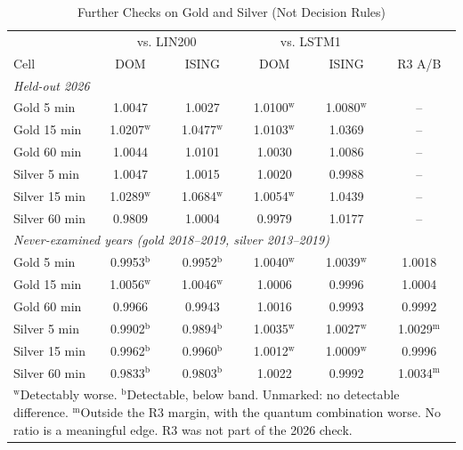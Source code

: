\documentclass{ieeeaccess}
\begin{document}
\begin{table}[t]
\caption{Further Checks on Gold and Silver (Not Decision Rules)}
\label{tab:heldcheck}
\centering
\setlength{\tabcolsep}{2.5pt}
\begin{tabular}{lccccc}
\hline
& \multicolumn{2}{c}{vs. LIN200} & \multicolumn{2}{c}{vs. LSTM1} & \\
Cell & DOM & ISING & DOM & ISING & R3 A/B \\
\hline
\multicolumn{6}{l}{\textit{Held-out 2026}} \\
Gold 5 min & 1.0047 & 1.0027 & 1.0100$^\mathrm{w}$ & 1.0080$^\mathrm{w}$ & -- \\
Gold 15 min & 1.0207$^\mathrm{w}$ & 1.0477$^\mathrm{w}$ & 1.0103$^\mathrm{w}$ & 1.0369 & -- \\
Gold 60 min & 1.0044 & 1.0101 & 1.0030 & 1.0086 & -- \\
Silver 5 min & 1.0047 & 1.0015 & 1.0020 & 0.9988 & -- \\
Silver 15 min & 1.0289$^\mathrm{w}$ & 1.0684$^\mathrm{w}$ & 1.0054$^\mathrm{w}$ & 1.0439 & -- \\
Silver 60 min & 0.9809 & 1.0004 & 0.9979 & 1.0177 & -- \\
\multicolumn{6}{l}{\textit{Never-examined years (gold 2018--2019, silver 2013--2019)}} \\
Gold 5 min & 0.9953$^\mathrm{b}$ & 0.9952$^\mathrm{b}$ & 1.0040$^\mathrm{w}$ & 1.0039$^\mathrm{w}$ & 1.0018 \\
Gold 15 min & 1.0056$^\mathrm{w}$ & 1.0046$^\mathrm{w}$ & 1.0006 & 0.9996 & 1.0004 \\
Gold 60 min & 0.9966 & 0.9943 & 1.0016 & 0.9993 & 0.9992 \\
Silver 5 min & 0.9902$^\mathrm{b}$ & 0.9894$^\mathrm{b}$ & 1.0035$^\mathrm{w}$ & 1.0027$^\mathrm{w}$ & 1.0029$^\mathrm{m}$ \\
Silver 15 min & 0.9962$^\mathrm{b}$ & 0.9960$^\mathrm{b}$ & 1.0012$^\mathrm{w}$ & 1.0009$^\mathrm{w}$ & 0.9996 \\
Silver 60 min & 0.9833$^\mathrm{b}$ & 0.9803$^\mathrm{b}$ & 1.0022 & 0.9992 & 1.0034$^\mathrm{m}$ \\
\hline
\multicolumn{6}{p{7.8cm}}{\footnotesize $^\mathrm{w}$Detectably worse. $^\mathrm{b}$Detectable, below band. Unmarked: no detectable difference. $^\mathrm{m}$Outside the R3 margin, with the quantum combination worse. No ratio is a meaningful edge. R3 was not part of the 2026 check.}\\
\end{tabular}
\end{table}
\end{document}
